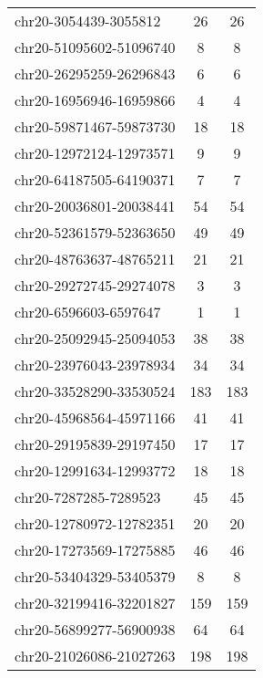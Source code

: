 \begin{longtable}{lSS}
	chr20-3054439-3055812   & 26     & 26                         \\
	chr20-51095602-51096740 & 8      & 8                          \\
	chr20-26295259-26296843 & 6      & 6                          \\
	chr20-16956946-16959866 & 4      & 4                          \\
	chr20-59871467-59873730 & 18     & 18                         \\
	chr20-12972124-12973571 & 9      & 9                          \\
	chr20-64187505-64190371 & 7      & 7                          \\
	chr20-20036801-20038441 & 54     & 54                         \\
	chr20-52361579-52363650 & 49     & 49                         \\
	chr20-48763637-48765211 & 21     & 21                         \\
	chr20-29272745-29274078 & 3      & 3                          \\
	chr20-6596603-6597647   & 1      & 1                          \\
	chr20-25092945-25094053 & 38     & 38                         \\
	chr20-23976043-23978934 & 34     & 34                         \\
	chr20-33528290-33530524 & 183    & 183                        \\
	chr20-45968564-45971166 & 41     & 41                         \\
	chr20-29195839-29197450 & 17     & 17                         \\
	chr20-12991634-12993772 & 18     & 18                         \\
	chr20-7287285-7289523   & 45     & 45                         \\
	chr20-12780972-12782351 & 20     & 20                         \\
	chr20-17273569-17275885 & 46     & 46                         \\
	chr20-53404329-53405379 & 8      & 8                          \\
	chr20-32199416-32201827 & 159    & 159                        \\
	chr20-56899277-56900938 & 64     & 64                         \\
	chr20-21026086-21027263 & 198    & 198                        \\

\end{longtable}
